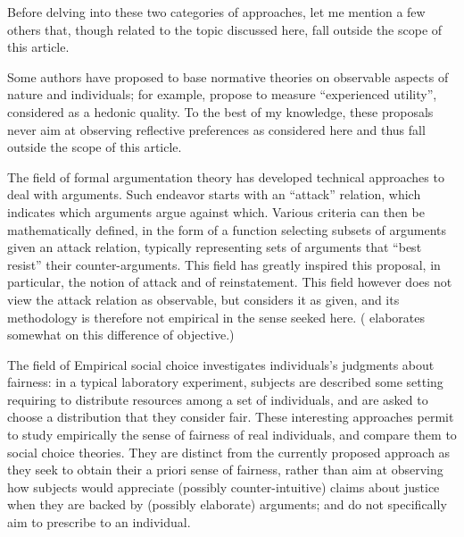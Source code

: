 \documentclass[version=last, pagesize, twoside=off, bibliography=totoc, DIV=calc, fontsize=12pt, a4paper, french, english]{scrartcl}
\begin{document}
Before delving into these two categories of approaches, let me mention a few others that, though related to the topic discussed here, fall outside the scope of this article.

Some authors have proposed to base normative theories on observable aspects of nature and individuals; for example, \citet{kahneman_back_1997} propose to measure “experienced utility”, considered as a hedonic quality. 
To the best of my knowledge, these proposals never aim at observing reflective preferences as considered here and thus fall outside the scope of this article.

The field of formal argumentation theory has developed technical approaches to deal with arguments. Such endeavor starts with an “attack” relation, which indicates which arguments argue against which. Various criteria can then be mathematically defined, in the form of a function selecting subsets of arguments given an attack relation, typically representing sets of arguments that “best resist” their counter-arguments. This field has greatly inspired this proposal, in particular, the notion of attack and of reinstatement. This field however does not view the attack relation as observable, but considers it as given, and its methodology is therefore not empirical in the sense seeked here. ( elaborates somewhat on this difference of objective.) 

The field of Empirical social choice \citep{gaertner_empirical_2012} investigates individuals’s judgments about fairness: in a typical laboratory experiment, subjects are described some setting requiring to distribute resources among a set of individuals, and are asked to choose a distribution that they consider fair. These interesting approaches permit to study empirically the sense of fairness of real individuals, and compare them to social choice theories. They are distinct from the currently proposed approach as they seek to obtain their a priori sense of fairness, rather than aim at observing how subjects would appreciate (possibly counter-intuitive) claims about justice when they are backed by (possibly elaborate) arguments; and do not specifically aim to prescribe to an individual.
\end{document}
